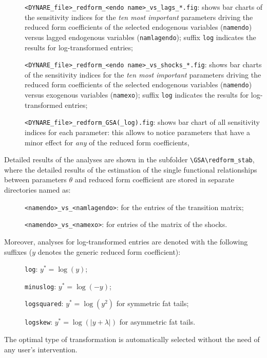 \documentclass[12pt,a4paper]{article}
\begin{document}
\begin{description}
\item[]\verb"<DYNARE_file>_redform_<endo name>_vs_lags_*.fig":
shows bar charts of the sensitivity indices for the \emph{ten most
important} parameters driving the reduced form coefficients of the
selected endogenous variables (\verb"namendo") versus lagged
endogenous variables (\verb"namlagendo"); suffix \verb"log"
indicates the results for  log-transformed entries;
\item[]\verb"<DYNARE_file>_redform_<endo name>_vs_shocks_*.fig":
shows bar charts of the sensitivity indices for the \emph{ten most
important} parameters driving the reduced form coefficients of the
selected endogenous variables (\verb"namendo") versus exogenous
variables (\verb"namexo"); suffix \verb"log" indicates the results
for  log-transformed entries;
\item[]\verb"<DYNARE_file>_redform_GSA(_log).fig": shows bar chart of
all sensitivity indices for each  parameter: this allows to notice
parameters that have a minor effect for \emph{any} of the reduced
form coefficients,
\end{description}

Detailed results of the analyses are shown in the subfolder
\verb"\GSA\redform_stab", where the detailed results of the
estimation of the single functional relationships between
parameters $\theta$ and reduced form coefficient are stored in
separate directories named as:
\begin{description}
\item[]\verb"<namendo>_vs_<namlagendo>": for the entries of the
transition matrix;
\item[]\verb"<namendo>_vs_<namexo>": for entries of the matrix of
the shocks.
\end{description}
Moreover, analyses for log-transformed entries are denoted with
the following suffixes ($y$ denotes the generic reduced form
coefficient):
\begin{description}
\item[]\verb"log": $y^*=\log(y)$;
\item[]\verb"minuslog": $y^*=\log(-y)$;
\item[]\verb"logsquared": $y^*=\log(y^2)$ for symmetric fat tails;
\item[]\verb"logskew": $y^*=\log(|y+\lambda|)$ for asymmetric fat tails.
\end{description}
The optimal type of transformation is automatically selected
without the need of any user's intervention.
\end{document}
